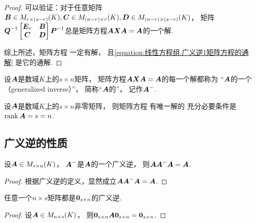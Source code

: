 \begin{theorem}[广义逆存在定理]
\begin{proof}
可以验证：对于任意矩阵\(
	\boldsymbol{B} \in M_{r \times (s-r)}(K),
	\boldsymbol{C} \in M_{(n-r) \times r}(K),
	\boldsymbol{D} \in M_{(n-r) \times (s-r)}(K)
\)，
矩阵\(
	\boldsymbol{Q}^{-1}
	\begin{bmatrix}
		\boldsymbol{E}_r & \boldsymbol{B} \\
		\boldsymbol{C} & \boldsymbol{D}
	\end{bmatrix}
	\boldsymbol{P}^{-1}
\)总是矩阵方程\(\boldsymbol{A} \boldsymbol{X} \boldsymbol{A} = \boldsymbol{A}\)的一个解.

综上所述，矩阵方程  一定有解，
且\cref{equation:线性方程组.广义逆1矩阵方程的通解} 是它的通解.
\end{proof}
\end{theorem}

\begin{definition}
设\(\boldsymbol{A}\)是数域\(K\)上的\(s \times n\)矩阵，
矩阵方程\(\boldsymbol{A} \boldsymbol{X} \boldsymbol{A} = \boldsymbol{A}\)的每一个解都称为
“\(\boldsymbol{A}\)的一个（generalized inverse）”，
简称“\(\boldsymbol{A}\)的”，
记作\(\boldsymbol{A}^-\).
\end{definition}

\begin{corollary}
设\(\boldsymbol{A}\)是数域\(K\)上的\(s \times n\)非零矩阵，
则矩阵方程  有唯一解的
充分必要条件是\(\rank\boldsymbol{A} = s = n\).
\end{corollary}

\subsection{广义逆的性质}
\begin{property}\label{theorem:线性方程组.广义逆的性质1}
设\(\boldsymbol{A} \in M_{s \times n}(K)\)，
\(\boldsymbol{A}^-\)是\(\boldsymbol{A}\)的一个广义逆，
则\(\boldsymbol{A} \boldsymbol{A}^- \boldsymbol{A} = \boldsymbol{A}\).
\begin{proof}
根据广义逆的定义，显然成立\(\boldsymbol{A} \boldsymbol{A}^- \boldsymbol{A} = \boldsymbol{A}\).
\end{proof}
\end{property}

\begin{property}\label{theorem:线性方程组.广义逆的性质2}
任意一个\(n \times s\)矩阵都是\(\boldsymbol0_{s \times n}\)的广义逆.
\begin{proof}
设\(\boldsymbol{A} \in M_{n \times s}(K)\)，
则\(\boldsymbol0_{s \times n} \boldsymbol{A} \boldsymbol0_{s \times n} = \boldsymbol0_{s \times n}\).
\end{proof}
\end{property}

